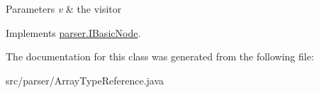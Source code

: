 \begin{DoxyParams}{Parameters}
{\em v} & the visitor \\
\hline
\end{DoxyParams}


Implements \hyperlink{interfaceparser_1_1_i_basic_node_af8790b7076c59e00781ba3d4118757cd}{parser.\+I\+Basic\+Node}.



The documentation for this class was generated from the following file\+:\begin{DoxyCompactItemize}
\item 
src/parser/Array\+Type\+Reference.\+java\end{DoxyCompactItemize}
